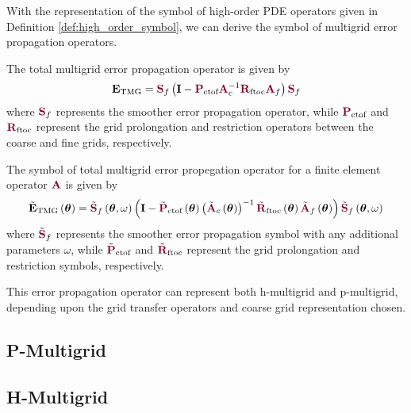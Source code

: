 With the representation of the symbol of high-order PDE operators given in Definition \ref{def:high_order_symbol}, we can derive the symbol of multigrid error propagation operators.

The total multigrid error propagation operator is given by
\begin{equation}
\mathbf{E}_{\text{TMG}} = {\color{burgundy}\mathbf{S}}_f \left( \mathbf{I} - {\color{burgundy}\mathbf{P}}_{\text{ctof}} {\color{burgundy}\mathbf{A}}_c^{-1} {\color{burgundy}\mathbf{R}}_{\text{ftoc}} {\color{burgundy}\mathbf{A}}_f \right) {\color{burgundy}\mathbf{S}}_f
\end{equation}
where ${\color{burgundy}\mathbf{S}}_f$ represents the smoother error propagation operator, while ${\color{burgundy}\mathbf{P}}_{\text{ctof}}$ and ${\color{burgundy}\mathbf{R}}_{\text{ftoc}}$ represent the grid prolongation and restriction operators between the coarse and fine grids, respectively.

\begin{definition}
The symbol of total multigrid error propegation operator for a finite element operator ${\color{burgundy}\mathbf{A}}$ is given by
\begin{equation}
\tilde{\mathbf{E}}_{\text{TMG}} \left( \boldsymbol{\theta} \right) = \tilde{{\color{burgundy}\mathbf{S}}}_f \left( \boldsymbol{\theta}, \omega \right) \left( \mathbf{I} - \tilde{{\color{burgundy}\mathbf{P}}}_{\text{ctof}} \left( \boldsymbol{\theta} \right) \left(\tilde{{\color{burgundy}\mathbf{A}}}_c \left( \boldsymbol{\theta} \right) \right)^{-1} \tilde{{\color{burgundy}\mathbf{R}}}_{\text{ftoc}} \left( \boldsymbol{\theta} \right) \tilde{{\color{burgundy}\mathbf{A}}}_f \left( \boldsymbol{\theta} \right) \right) \tilde{{\color{burgundy}\mathbf{S}}}_f \left( \boldsymbol{\theta}, \omega \right)
\end{equation}
where $\tilde{{\color{burgundy}\mathbf{S}}}_f$ represents the smoother error propagation symbol with any additional parameters $\omega$, while $\tilde{{\color{burgundy}\mathbf{P}}}_{\text{ctof}}$ and $\tilde{{\color{burgundy}\mathbf{R}}}_{\text{ftoc}}$ represent the grid prolongation and restriction symbols, respectively.
\label{def:multigrid_symbol}
\end{definition}

This error propagation operator can represent both h-multigrid and p-multigrid, depending upon the grid transfer operators and coarse grid representation chosen.

\subsection{P-Multigrid}


\subsection{H-Multigrid}


